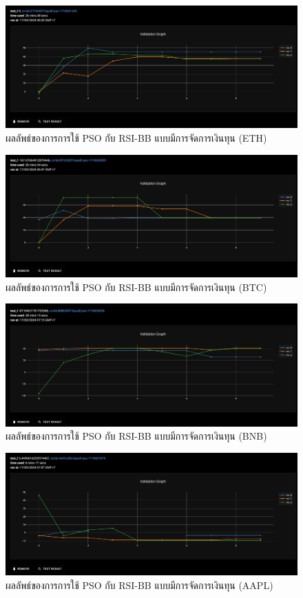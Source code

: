 \begin{figure}[ht]
    \centering
    \includegraphics[width=\textwidth]{images/pso/rsi-bb/eth-liquid.png}
    \caption{ผลลัพธ์ของการการใช้ PSO กับ RSI-BB แบบมีการจัดการเงินทุน (ETH)}
\end{figure}
\begin{figure}[ht]
    \centering
    \includegraphics[width=\textwidth]{images/pso/rsi-bb/btc-liquid.png}
    \caption{ผลลัพธ์ของการการใช้ PSO กับ RSI-BB แบบมีการจัดการเงินทุน (BTC)}
\end{figure}
\begin{figure}[ht]
    \centering
    \includegraphics[width=\textwidth]{images/pso/rsi-bb/bnb-liquid.png}
    \caption{ผลลัพธ์ของการการใช้ PSO กับ RSI-BB แบบมีการจัดการเงินทุน (BNB)}
\end{figure}
\begin{figure}[ht]
    \centering
    \includegraphics[width=\textwidth]{images/pso/rsi-bb/aapl-liquid.png}
    \caption{ผลลัพธ์ของการการใช้ PSO กับ RSI-BB แบบมีการจัดการเงินทุน (AAPL)}
\end{figure}
